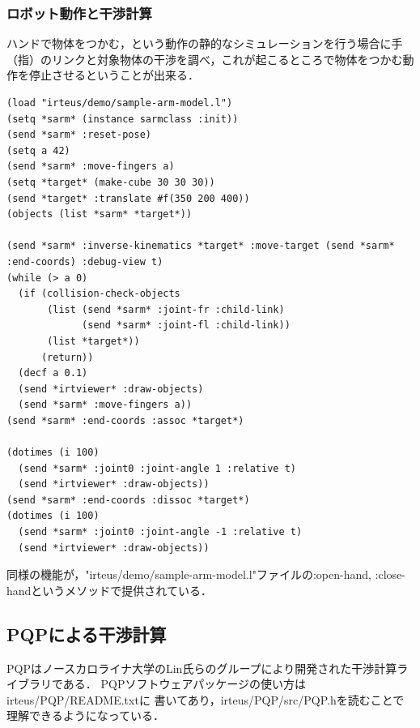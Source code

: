 \subsubsection{ロボット動作と干渉計算}
ハンドで物体をつかむ，という動作の静的なシミュレーションを行う場合に手（指）のリンクと対象物体の干渉を調べ，これが起こるところで物体をつかむ動作を停止させるということが出来る．

{\baselineskip=10pt
\begin{verbatim}
(load "irteus/demo/sample-arm-model.l")
(setq *sarm* (instance sarmclass :init))
(send *sarm* :reset-pose)
(setq a 42)
(send *sarm* :move-fingers a)
(setq *target* (make-cube 30 30 30))
(send *target* :translate #f(350 200 400))
(objects (list *sarm* *target*))

(send *sarm* :inverse-kinematics *target* :move-target (send *sarm* :end-coords) :debug-view t)
(while (> a 0)
  (if (collision-check-objects
       (list (send *sarm* :joint-fr :child-link)
             (send *sarm* :joint-fl :child-link))
       (list *target*))
      (return))
  (decf a 0.1)
  (send *irtviewer* :draw-objects)
  (send *sarm* :move-fingers a))
(send *sarm* :end-coords :assoc *target*)

(dotimes (i 100)
  (send *sarm* :joint0 :joint-angle 1 :relative t)
  (send *irtviewer* :draw-objects))
(send *sarm* :end-coords :dissoc *target*)
(dotimes (i 100)
  (send *sarm* :joint0 :joint-angle -1 :relative t)
  (send *irtviewer* :draw-objects))
\end{verbatim}
}

同様の機能が，"irteus/demo/sample-arm-model.l"ファイルの:open-hand,
:close-handというメソッドで提供されている．

\subsection{PQPによる干渉計算}

PQPはノースカロライナ大学のLin氏らのグループにより開発された干渉計算ライブラリである．
PQPソフトウェアパッケージの使い方はirteus/PQP/README.txtに
書いてあり，irteus/PQP/src/PQP.hを読むことで理解できるようになっている．

